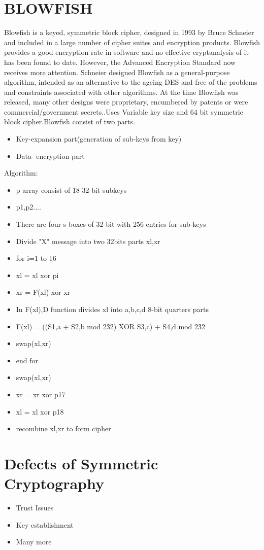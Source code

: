 \documentclass[12pt,a4paper]{report}
\begin{document}
\section{BLOWFISH}
Blowfish is a keyed, symmetric block cipher, designed in 1993 by Bruce Schneier and included in a large number of cipher suites and encryption products. Blowfish provides a good encryption rate in software and no effective cryptanalysis of it has been found to date. However, the Advanced Encryption Standard now receives more attention. Schneier designed Blowfish as a general-purpose algorithm, intended as an alternative to the ageing DES and free of the problems and constraints associated with other algorithms. At the time Blowfish was released, many other designs were proprietary, encumbered by patents or were commercial/government secrets..Uses Variable key size and 64 bit symmetric block cipher.Blowfish consist of two parts.
\begin{itemize}
\item Key-expansion part(generation of sub-keys from key)
\item Data- encryption part
\end{itemize}
Algorithm:
\begin{itemize}
\item p array consist of 18 32-bit subkeys
\item p1,p2....
\item There are four s-boxes of 32-bit with 256 entries for sub-keys
\item Divide "X" message into two 32bits parts xl,xr
\item for i=1 to 16
\item xl = xl xor pi
\item xr = F(xl) xor xr
\item In F(xl),D function divides xl into a,b,c,d 8-bit quarters parts
\item F(xl) = ((S1,a + S2,b mod 2\^ 32) XOR S3,c) + S4,d mod 2\^ 32
\item swap(xl,xr)
\item end for
\item swap(xl,xr)
\item xr = xr xor p17
\item xl = xl xor p18
\item recombine xl,xr to form cipher
\end{itemize}
\section{Defects of Symmetric Cryptography}
\begin{itemize}
\item Trust Issues
\item Key establishment
\item Many more
\end{itemize}
\end{document}
